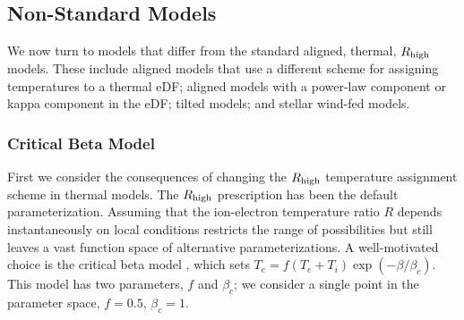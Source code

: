 


\subsection{Non-Standard Models}

We now turn to models that differ from the standard aligned, thermal, $R_\mathrm{high}$ models.  These include aligned models that use a different scheme for assigning temperatures to a thermal eDF; aligned models with a power-law component or kappa component in the eDF; tilted models; and stellar wind-fed models.

\subsubsection{Critical Beta Model}

First we consider the consequences of changing the $R_\mathrm{high}$ temperature assignment scheme in thermal models.  The $R_\mathrm{high}$ prescription has been the default parameterization.  Assuming that the ion-electron temperature ratio $R$ depends instantaneously on local conditions restricts the range of possibilities but still leaves a vast function space of alternative parameterizations.  A well-motivated choice is the critical beta model \citep{2020MNRAS.493.1404A}, which sets $T_e = f (T_e + T_i) \exp(-\beta/\beta_c)$.  This model has two parameters, $f$ and $\beta_c$; we consider a single point in the parameter space, $f = 0.5$, $\beta_c = 1$.

